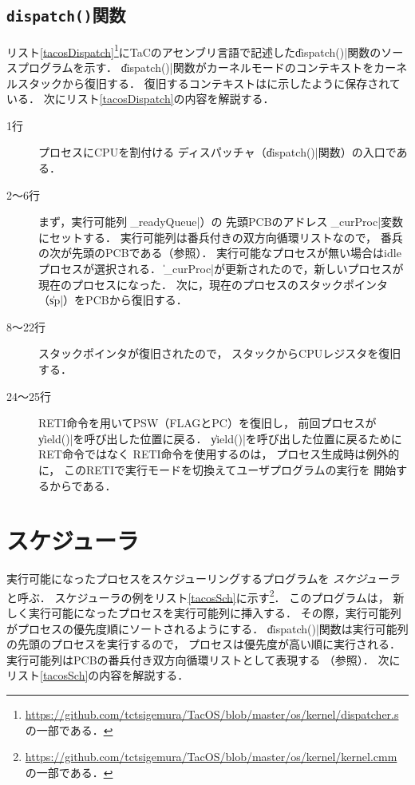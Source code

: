 \subsection{\texttt{dispatch()}関数}
リスト\ref{tacosDispatch}\footnote{
  \url{https://github.com/tctsigemura/TacOS/blob/master/os/kernel/dispatcher.s}
  の一部である．
}にTaCのアセンブリ言語で記述した\|dispatch()|関数のソースプログラムを示す．
\|dispatch()|関数がカーネルモードのコンテキストをカーネルスタックから復旧する．
復旧するコンテキストはに示したように保存されている．
次にリスト\ref{tacosDispatch}の内容を解説する．



\begin{description}
    \item[1行] プロセスにCPUを割付ける
      ディスパッチャ（\|dispatch()|関数）の入口である．
    \item[2〜6行] まず，実行可能列（\|_readyQueue|）の
      先頭PCBのアドレスを\|_curProc|変数にセットする．
      実行可能列は番兵付きの双方向循環リストなので，
      番兵の次が先頭のPCBである（参照）．
      実行可能なプロセスが無い場合はidleプロセスが選択される．
      \|_curProc|が更新されたので，新しいプロセスが現在のプロセスになった．
      次に，現在のプロセスのスタックポインタ（\|sp|）をPCBから復旧する．
    \item[8〜22行] スタックポインタが復旧されたので，
      スタックからCPUレジスタを復旧する．
    \item[24〜25行] RETI命令を用いてPSW（FLAGとPC）を復旧し，
      前回プロセスが\|yield()|を呼び出した位置に戻る．
      \|yield()|を呼び出した位置に戻るためにRET命令ではなく
      RETI命令を使用するのは，
      プロセス生成時は例外的に，
      このRETIで実行モードを切換えてユーザプログラムの実行を
      開始するからである．
\end{description}

\section{スケジューラ}
\label{tacosScheduler}
実行可能になったプロセスをスケジューリングするプログラムを
\emph{スケジューラ}と呼ぶ．
スケジューラの例をリスト\ref{tacosSch}に示す\footnote{
  \url{https://github.com/tctsigemura/TacOS/blob/master/os/kernel/kernel.cmm}
  の一部である．}．
このプログラムは，
新しく実行可能になったプロセスを実行可能列に挿入する．
その際，実行可能列がプロセスの優先度順にソートされるようにする．
\|dispatch()|関数は実行可能列の先頭のプロセスを実行するので，
プロセスは優先度が高い順に実行される．
実行可能列はPCBの番兵付き双方向循環リストとして表現する
（参照）．
次にリスト\ref{tacosSch}の内容を解説する．


